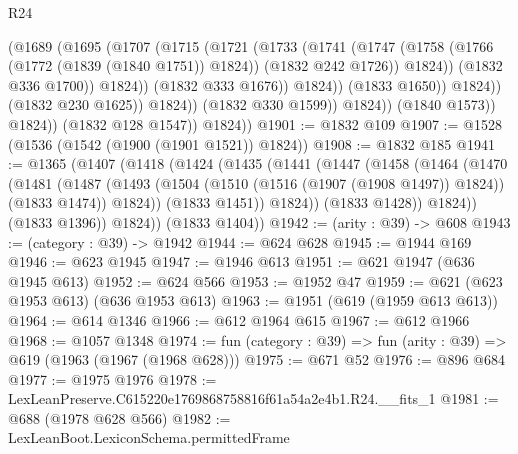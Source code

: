 \begin{lexlean}{R24}
\begin{coremodule}
                                  (@1689
                                    (@1695
                                      (@1707
                                        (@1715
                                          (@1721
                                            (@1733
                                              (@1741
                                                (@1747
                                                  (@1758
                                                    (@1766 (@1772 (@1839 (@1840 @1751)) @1824))
                                                    (@1832 @242 @1726))
                                                  @1824))
                                              (@1832 @336 @1700))
                                            @1824))
                                        (@1832 @333 @1676))
                                      @1824))
                                  (@1833 @1650))
                                @1824))
                            (@1832 @230 @1625))
                          @1824))
                      (@1832 @330 @1599))
                    @1824))
                (@1840 @1573))
              @1824))
          (@1832 @128 @1547))
        @1824))
@1901 := @1832 @109
@1907 := @1528 (@1536 (@1542 (@1900 (@1901 @1521)) @1824))
@1908 := @1832 @185
@1941 := @1365
    (@1407
      (@1418
        (@1424
          (@1435
            (@1441
              (@1447
                (@1458
                  (@1464
                    (@1470
                      (@1481
                        (@1487
                          (@1493
                            (@1504 (@1510 (@1516 (@1907 (@1908 @1497)) @1824)) (@1833 @1474))
                            @1824))
                        (@1833 @1451))
                      @1824))
                  (@1833 @1428))
                @1824))
            (@1833 @1396))
          @1824))
      (@1833 @1404))
@1942 := (arity : @39) -> @608
@1943 := (category : @39) -> @1942
@1944 := @624 @628
@1945 := @1944 @169
@1946 := @623 @1945
@1947 := @1946 @613
@1951 := @621 @1947 (@636 @1945 @613)
@1952 := @624 @566
@1953 := @1952 @47
@1959 := @621 (@623 @1953 @613) (@636 @1953 @613)
@1963 := @1951 (@619 (@1959 @613 @613))
@1964 := @614 @1346
@1966 := @612 @1964 @615
@1967 := @612 @1966
@1968 := @1057 @1348
@1974 := fun (category : @39) => fun (arity : @39) => @619 (@1963 (@1967 (@1968 @628)))
@1975 := @671 @52
@1976 := @896 @684
@1977 := @1975 @1976
@1978 := LexLeanPreserve.C615220e1769868758816f61a54a2e4b1.R24.__fits_1
@1981 := @688 (@1978 @628 @566)
@1982 := LexLeanBoot.LexiconSchema.permittedFrame

\end{coremodule}
\end{lexlean}
